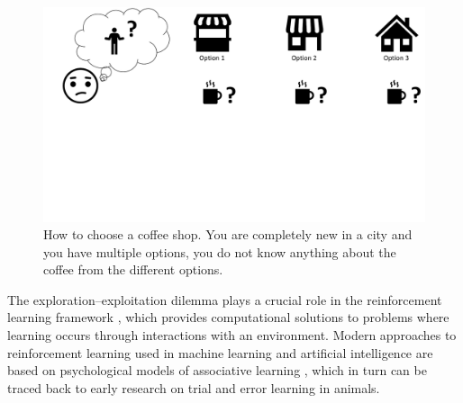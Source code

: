 \begin{figure}
    \centering
    \includegraphics[width=1\textwidth]{Plots/CoffeExample.pdf}
    \vspace{-4cm}
    \caption[Coffe Shop Example]{How to choose a coffee shop. You are completely new in a city and you have multiple options, you do not know anything about the coffee from the different options.}
    \label{fig:Coffe_Example}
\end{figure}


The exploration--exploitation dilemma plays a crucial role in the reinforcement learning framework \citep{sutton2018reinforcement}, which provides computational solutions to problems where learning occurs through interactions with an environment. %
Modern approaches to reinforcement learning used in machine learning and artificial intelligence are based on psychological models of associative learning \citep{sutton2018reinforcement}, which in turn can be traced back to early research on trial and error learning in animals. %

